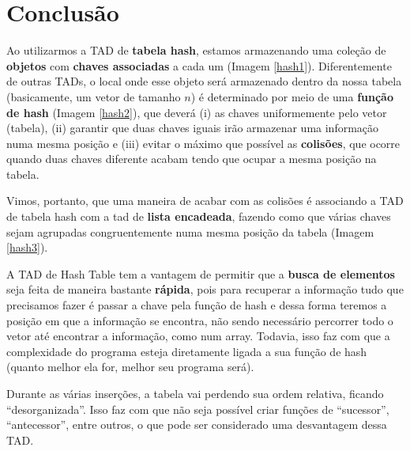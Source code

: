 \documentclass[12pt, a4paper]{article}
\begin{document}
\section{Conclusão}

Ao utilizarmos a TAD de \textbf{tabela hash}, estamos armazenando uma coleção de \textbf{objetos} com \textbf{chaves associadas} a cada um (Imagem \ref{hash1}). Diferentemente de outras TADs, o local onde esse objeto será armazenado dentro da nossa tabela (basicamente, um vetor de tamanho $n$) é determinado por meio de uma \textbf{função de hash} (Imagem \ref{hash2}), que deverá (i) as chaves uniformemente pelo vetor (tabela), (ii) garantir que duas chaves iguais irão armazenar uma informação numa mesma posição e (iii) evitar o máximo que possível as \textbf{colisões}, que ocorre quando duas chaves diferente acabam tendo que ocupar a mesma posição na tabela.

Vimos, portanto, que uma maneira de acabar com as colisões é associando a TAD de tabela hash com a tad de \textbf{lista encadeada}, fazendo como que várias chaves sejam agrupadas congruentemente numa mesma posição da tabela (Imagem \ref{hash3}).

A TAD de Hash Table tem a vantagem de permitir que a \textbf{busca de elementos} seja feita de maneira bastante \textbf{rápida}, pois para recuperar a informação tudo que precisamos fazer é passar a chave pela função de hash e dessa forma teremos a posição em que a informação se encontra, não sendo necessário percorrer todo o vetor até encontrar a informação, como num array. Todavia, isso faz com que a complexidade do programa esteja diretamente ligada a sua função de hash (quanto melhor ela for, melhor seu programa será).

Durante as várias inserções, a tabela vai perdendo sua ordem relativa, ficando ``desorganizada''. Isso faz com que não seja possível criar funções de ``sucessor'', ``antecessor'', entre outros, o que pode ser considerado uma desvantagem dessa TAD.

\clearpage


\end{document}
